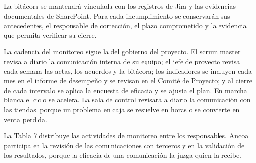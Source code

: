 \documentclass[11pt]{article}
\begin{document}
La bitácora se mantendrá vinculada con los registros de Jira y las
evidencias documentales de SharePoint. Para cada incumplimiento se
conservarán sus antecedentes, el responsable de corrección, el plazo
comprometido y la evidencia que permita verificar su cierre.

La cadencia del monitoreo sigue la del gobierno del proyecto. El scrum
master revisa a diario la comunicación interna de su equipo; el jefe de
proyecto revisa cada semana las actas, los acuerdos y la bitácora; los
indicadores se incluyen cada mes en el informe de desempeño y se revisan
en el Comité de Proyecto; y al cierre de cada intervalo se aplica la
encuesta de eficacia y se ajusta el plan. En marcha blanca el ciclo se
acelera. La sala de control revisará a diario la comunicación con las
tiendas, porque un problema en caja se resuelve en horas o se convierte
en venta perdida.

La Tabla 7 distribuye las actividades de monitoreo entre los
responsables. Ancoa participa en la revisión de las comunicaciones con
terceros y en la validación de los resultados, porque la eficacia de una
comunicación la juzga quien la recibe.
\end{document}
